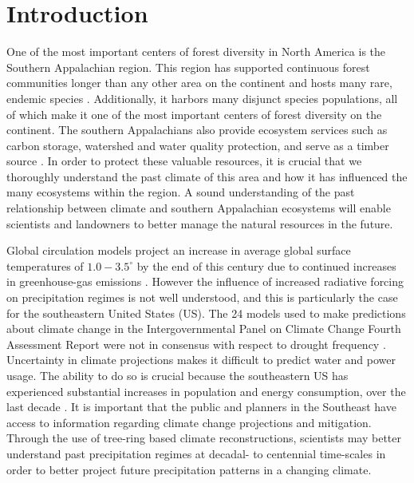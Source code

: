\section{Introduction}


One of the most important centers of forest diversity in North America is the Southern Appalachian region. This region has supported continuous forest communities longer than any other area on the continent and hosts many rare, endemic species \cite{NCNHP2012}. Additionally, it harbors many disjunct species populations, all of which make it one of the most important centers of forest diversity on the continent. The southern Appalachians also provide ecosystem services such as carbon storage, watershed and water quality protection, and serve as a timber source \cite{zipper2011restoring}. In order to protect these valuable resources, it is crucial that we thoroughly understand the past climate of this area and how it has influenced the many ecosystems within the region.  A sound understanding of the past relationship between climate and southern Appalachian ecosystems will enable scientists and landowners to better manage the natural resources in the future. 

Global circulation models project an increase in average global surface temperatures of $1.0-3.5^{\circ}$ by the end of this century due to continued increases in greenhouse-gas emissions \cite{pachauri2007climate, kattenberg1996climate}. However the influence of increased radiative forcing on precipitation regimes is not well understood, and this is particularly the case for the southeastern United States (US). The 24 models used to make predictions about climate change in the Intergovernmental Panel on Climate Change Fourth Assessment Report were not in consensus with respect to drought frequency \cite{pachauri2007climate, seager2009drought}.  Uncertainty in climate projections makes it difficult to predict water and power usage. The ability to do so is crucial because the southeastern US has experienced substantial increases in population and energy consumption, over the last decade \cite{seager2009drought, sobolowski2012evaluation}. It is important that the public and planners in the Southeast have access to information regarding climate change projections and mitigation. Through the use of tree-ring based climate reconstructions, scientists may better understand past precipitation regimes at decadal- to centennial time-scales in order to better project future precipitation patterns in a changing climate. 

